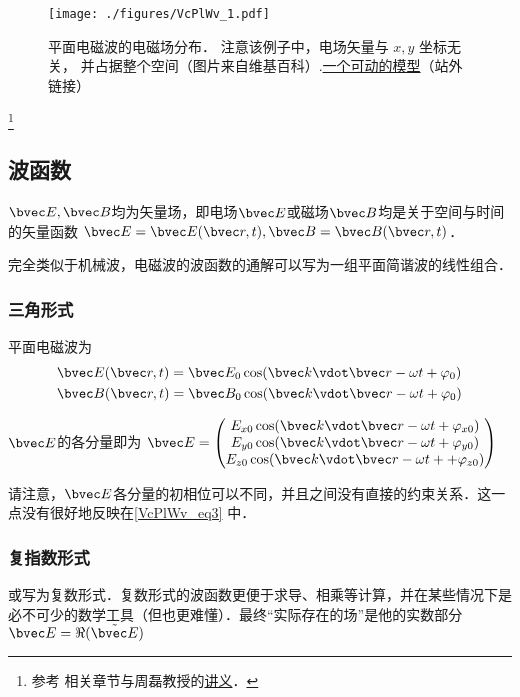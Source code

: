 

\begin{figure}[ht]
\centering
\texttt{[image: ./figures/VcPlWv\_1.pdf]}
\caption{平面电磁波的电磁场分布． 注意该例子中，电场矢量与 $x, y$ 坐标无关， 并占据整个空间（图片来自维基百科）.\href{https://www.geogebra.org/m/xhYwXSsH}{一个可动的模型}（站外链接）} \label{VcPlWv_fig1}
\end{figure}

\footnote{参考 \cite{GriffE} 相关章节与周磊教授的\href{http://fdjpkc.fudan.edu.cn/d200927/2009/0314/c8569a14801/page.htm}{讲义}．}


\subsection{波函数}
$\bvec E, \bvec B$均为矢量场，即电场$\bvec E$或磁场$\bvec B$均是关于空间与时间的矢量函数 $\bvec E = \bvec E(\bvec r, t), \bvec B = \bvec B(\bvec r, t)$．

完全类似于机械波，电磁波的波函数的通解可以写为一组平面简谐波的线性组合．

\subsubsection{三角形式}
平面电磁波为
\begin{align}\label{VcPlWv_eq3}
&\bvec E(\bvec r, t) = \bvec E_0 \cos(\bvec k\vdot \bvec r - \omega t + \varphi_0)\\
&\bvec B(\bvec r, t) = \bvec B_0 \cos(\bvec k \vdot \bvec r - \omega t + \varphi_0)
\end{align}

$\bvec E$的各分量即为
$\bvec E = 
\begin{pmatrix}
E_{x0} \cos(\bvec k\vdot \bvec r - \omega t+ \varphi_{x0})\\
E_{y0} \cos(\bvec k\vdot \bvec r - \omega t+ \varphi_{y0})\\
E_{z0} \cos(\bvec k\vdot \bvec r - \omega t++ \varphi_{z0})\\
\end{pmatrix}
$

请注意，$\bvec E$各分量的初相位可以不同，并且之间没有直接的约束关系．这一点没有很好地反映在\autoref{VcPlWv_eq3} 中．

\subsubsection{复指数形式}
\pentry{}
或写为复数形式．复数形式的波函数更便于求导、相乘等计算，并在某些情况下是必不可少的数学工具（但也更难懂）．最终“实际存在的场”是他的实数部分 $\bvec E = \Re (\tilde {\bvec E})$

